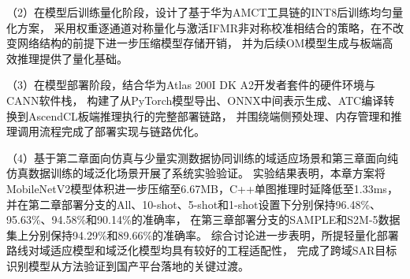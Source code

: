 （2）在模型后训练量化阶段，设计了基于华为AMCT工具链的INT8后训练均匀量化方案，
采用权重逐通道对称量化与激活IFMR非对称校准相结合的策略，在不改变网络结构的前提下进一步压缩模型存储开销，
并为后续OM模型生成与板端高效推理提供了量化基础。

（3）在模型部署阶段，结合华为Atlas 200I DK A2开发者套件的硬件环境与CANN软件栈，
构建了从PyTorch模型导出、ONNX中间表示生成、ATC编译转换到AscendCL板端推理执行的完整部署链路，
并围绕端侧预处理、内存管理和推理调用流程完成了部署实现与链路优化。

（4）基于第二章面向仿真与少量实测数据协同训练的域适应场景和第三章面向纯仿真数据训练的域泛化场景开展了系统实验验证。
实验结果表明，本章方案将MobileNetV2模型体积进一步压缩至6.67MB，C++单图推理时延降低至1.33ms，
并在第二章部署分支的All、10-shot、5-shot和1-shot设置下分别保持96.48\%、95.63\%、94.58\%和90.14\%的准确率，
在第三章部署分支的SAMPLE和S2M-5数据集上分别保持94.29\%和89.66\%的准确率。
综合讨论进一步表明，所提轻量化部署路线对域适应模型和域泛化模型均具有较好的工程适配性，
完成了跨域SAR目标识别模型从方法验证到国产平台落地的关键过渡。

